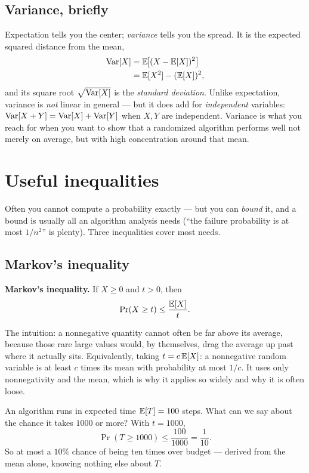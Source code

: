 \subsection{Variance, briefly}

Expectation tells you the center; \emph{variance} tells you the spread. It is the
expected squared distance from the mean,
\begin{align*}
\operatorname{Var}[X] &= \mathbb{E}\!\big[(X - \mathbb{E}[X])^2\big] \\
&= \mathbb{E}[X^2] - (\mathbb{E}[X])^2,
\end{align*}
and its square root $\sqrt{\operatorname{Var}[X]}$ is the \emph{standard deviation}. Unlike
expectation, variance is \emph{not} linear in general --- but it does add for
\emph{independent} variables: $\operatorname{Var}[X+Y] = \operatorname{Var}[X] + \operatorname{Var}[Y]$ when $X, Y$ are
independent. Variance is what you reach for when you want to show that a randomized
algorithm performs well not merely on average, but with high concentration around that mean.

\section{Useful inequalities}
\label{ch38:inequalities}

Often you cannot compute a probability exactly --- but you can \emph{bound} it, and a
bound is usually all an algorithm analysis needs (``the failure probability is at most
$1/n^2$'' is plenty). Three inequalities cover most needs.

\subsection{Markov's inequality}

\begin{formalbox}
\textbf{Markov's inequality.} If $X \ge 0$ and $t > 0$, then
\[
\Pr(X \ge t) \le \frac{\mathbb{E}[X]}{t}.
\]
\end{formalbox}

The intuition: a nonnegative quantity cannot often be far above its average, because
those rare large values would, by themselves, drag the average up past where it
actually sits. Equivalently, taking $t = c\,\mathbb{E}[X]$: a nonnegative random variable is at
least $c$ times its mean with probability at most $1/c$. It uses only
nonnegativity and the mean, which is why it applies so widely and why it is often
loose.

\begin{example}
\label{ch38:ex-markov}
An algorithm runs in expected time $\mathbb{E}[T] = 100$ steps. What can we say about the
chance it takes $1000$ or more? With $t = 1000$,
\[
\Pr(T \ge 1000) \le \frac{100}{1000} = \frac{1}{10}.
\]
So at most a $10\%$ chance of being ten times over budget --- derived from the mean
alone, knowing nothing else about $T$.
\end{example}


